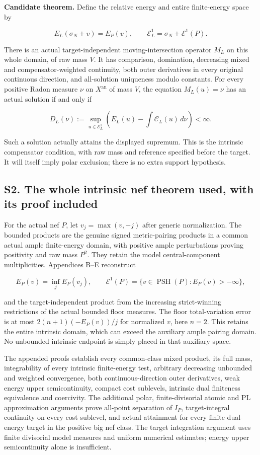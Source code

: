 \documentclass[
  10pt,
]{article}
\begin{document}
\textbf{Candidate theorem.} Define the relative energy and entire
finite-energy space by

\[E_L(\sigma_N+v)=E_P(v),\qquad \mathcal E_L^1=\sigma_N+\mathcal E^1(P).\]

There is an actual target-independent moving-intersection operator
\(M_L\) on this whole domain, of raw mass \(V\). It has comparison,
domination, decreasing mixed and compensator-weighted continuity, both
outer derivatives in every original continuous direction, and
all-solution uniqueness modulo constants. For every positive Radon
measure \(\nu\) on \(X^{\mathrm{an}}\) of mass \(V\), the equation
\(M_L(u)=\nu\) has an actual solution if and only if

\[D_L(\nu):=\sup_{u\in\mathcal E_L^1}\left(E_L(u)-\int\mathcal C_L(u)\,d\nu\right)<\infty.\]

Such a solution actually attains the displayed supremum. This is the
intrinsic compensator condition, with raw mass and reference specified
before the target. It will itself imply polar exclusion; there is no
extra support hypothesis.

\subsection{S2. The whole intrinsic nef theorem used, with its proof
included}\label{s2.-the-whole-intrinsic-nef-theorem-used-with-its-proof-included}

For the actual nef \(P\), let \(v_j=\max(v,-j)\) after generic
normalization. The bounded products are the genuine signed
metric-pairing products in a common actual ample finite-energy domain,
with positive ample perturbations proving positivity and raw mass
\(P^2\). They retain the model central-component multiplicities.
Appendices B--E reconstruct

\[E_P(v)=\inf_j E_P(v_j),\qquad \mathcal E^1(P)=\{v\in\operatorname{PSH}(P):E_P(v)>-\infty\},\]

and the target-independent product from the increasing strict-winning
restrictions of the actual bounded floor measures. The floor
total-variation error is at most \(2(n+1)(-E_P(v))/j\) for normalized
\(v\), here \(n=2\). This retains the entire intrinsic domain, which can
exceed the auxiliary ample pairing domain. No unbounded intrinsic
endpoint is simply placed in that auxiliary space.

The appended proofs establish every common-class mixed product, its full
mass, integrability of every intrinsic finite-energy test, arbitrary
decreasing unbounded and weighted convergence, both continuous-direction
outer derivatives, weak energy upper semicontinuity, compact cost
sublevels, intrinsic dual finiteness equivalence and coercivity. The
additional polar, finite-divisorial atomic and PL approximation
arguments prove all-point separation of \(I_P\), target-integral
continuity on every cost sublevel, and actual attainment for every
finite-dual-energy target in the positive big nef class. The target
integration argument uses finite divisorial model measures and uniform
numerical estimates; energy upper semicontinuity alone is insufficient.
\end{document}
